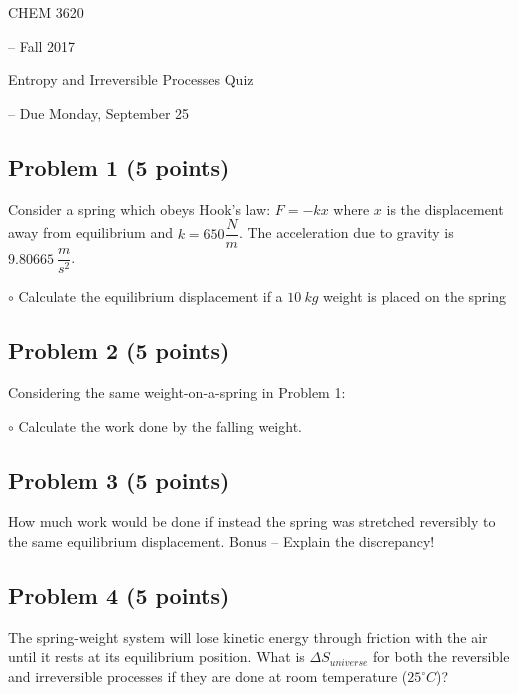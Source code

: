 \documentclass[12pt, letterpaper]{memoir}
\begin{document}
	\begin{center}
		{\Large CHEM 3620}
		{\large-- Fall 2017
		
		Entropy and Irreversible Processes Quiz} -- Due Monday, September 25
	\end{center}
		
	\subsection*{Problem 1 (5 points)}
Consider a spring which obeys Hook's law: $F=-kx$ where $x$ is the displacement away from equilibrium and $k=650\dfrac{N}{m}$. The acceleration due to gravity is $9.80665~\dfrac{m}{s^2}$.

$\circ$ Calculate the equilibrium displacement if a $10~kg$ weight is placed on the spring

\noindent 

\vspace{16em}
	
	\subsection*{Problem 2  (5 points)}	
Considering the same weight-on-a-spring in Problem 1:

$\circ$ Calculate the work done by the falling weight.

\vspace{20em}

	\subsection*{Problem 3 (5 points)}
How much work would be done if instead the spring was stretched reversibly to the same equilibrium displacement. Bonus -- Explain the discrepancy!

\vspace{20em}

	\subsection*{Problem 4 (5 points)}
The spring-weight system will lose kinetic energy through friction with the air until it rests at its equilibrium position. What is $\Delta S_{universe}$ for both the reversible and irreversible processes if they are done at room temperature ($25^\circ C$)?
\end{document}
